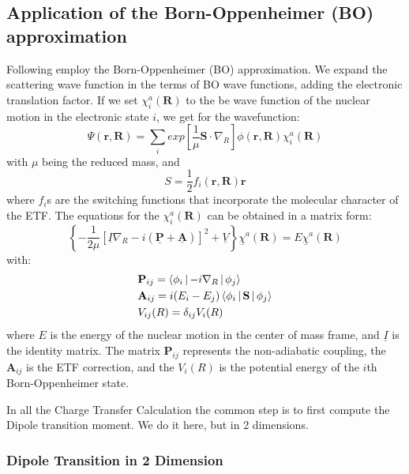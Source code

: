 \subsection{Application of the Born-Oppenheimer (BO) approximation}

Following \cite{Zygelman89}  employ the Born-Oppenheimer (BO) approximation. We expand the scattering wave function in the terms of BO wave functions, adding the electronic translation factor.
If we set $ \chi_i^a(\mathbf{R}) $ to the be wave function of the nuclear motion in the electronic state $ i $, we get for the wavefunction:
\begin{equation}
\Psi(\mathbf{r},\mathbf{R}) = \sum_i{exp\left[\frac{1}{\mu}\mathbf{S}\cdot\nabla_R \right]\phi(\mathbf{r},\mathbf{R}) }\chi_i^a(\mathbf{R})
\end{equation}
with $ \mu $ being the reduced mass, and
\begin{equation}
S = \frac{1}{2}f_i(\mathbf{r},\mathbf{R})\mathbf{r}
\end{equation}
where $ f_i $s are the switching functions that incorporate the molecular character of the ETF.
The equations for the $ \chi_i^a(\mathbf{R}) $ can be obtained in a matrix form:
\begin{equation}
\left\{-\frac{1}{2\mu}\left[\underline{I}\nabla_R - i(\underline{\mathbf{P}} + \underline{\mathbf{A}})\right]^2 + \underline{V}\right\}\underline{\chi}^a(\mathbf{R}) = E\underline{\chi}^a(\mathbf{R})
\end{equation}
with:
\begin{equation}\label{matrixFactors1}
\begin{split}
& \mathbf{P}_{ij} = \Braket{\phi_i | -i\nabla_R | \phi_j} \\*
& \mathbf{A}_{ij} = i(E_i - E_j)\Braket{\phi_i | \mathbf{S} | \phi_j} \\*
& V_{ij}(R) = \delta_{ij}V_i(R)
\end{split}
\end{equation}
where $ E $ is the energy of the nuclear motion in the center of mass frame, and $ \underline{I} $ is the identity matrix. The matrix $ \mathbf{P}_{ij} $ represents the non-adiabatic coupling, the $ \mathbf{A}_{ij} $ is the ETF correction, and the $ V_i(R) $ is the potential energy of the $ i $th Born-Oppenheimer state.

In all the Charge Transfer Calculation the common step is to first compute the Dipole transition moment. We do it here, but in 2 dimensions.

\subsubsection{Dipole Transition in 2 Dimension}

